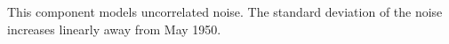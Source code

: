 This component models uncorrelated noise.
The standard deviation of the noise increases linearly away from May 1950.